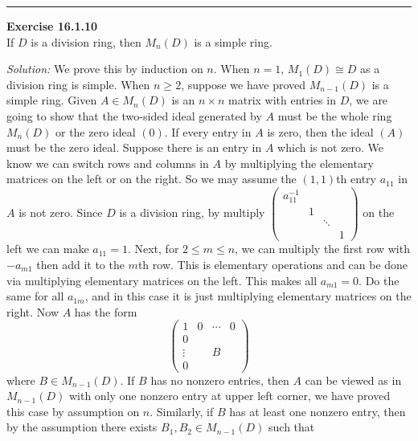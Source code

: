 \documentclass[a4paper, 12pt]{article}
\newenvironment{problem}[2][Exercise]
    { \begin{mdframed}[backgroundcolor=gray!20] \textbf{#1 #2} \\}
    {  \end{mdframed}}
\newenvironment{solution}
    {\textit{Solution:}}
    {}
\begin{document}
\noindent\rule{7in}{2.8pt}
\begin{problem}{16.1.10}
If \(D\) is a division ring, then \(M_n(D)\) is a simple ring.
\end{problem}
\begin{solution}
We prove this by induction on \(n\). When \(n=1\), \(M_1(D)\cong D\) as a division ring is simple. When \(n\geq 2\), suppose we have proved \(M_{n-1}(D)\) is a simple ring. Given \(A\in M_n(D)\) is an \(n\times n\) 
matrix with entries in \(D\), we are going to show that the two-sided ideal generated by \(A\) must be the whole ring \(M_n(D)\) or the zero ideal \((0)\). If every entry in \(A\) is zero, then the ideal \((A)\) must be the zero ideal. Suppose there is an entry in \(A\) which is 
not zero. We know we can switch rows and columns in \(A\) by multiplying the elementary matrices on the left or on the right. So we may assume the \((1,1)\)th entry \(a_{11}\) in \(A\) is not zero. Since \(D\) is a division ring, by multiply 
\(\begin{pmatrix}
    a_{11}^{-1}& & & \\
    & 1 & & \\ 
    & & \ddots & \\ 
    & & & 1
\end{pmatrix}\) on the left we can make \(a_{11}=1\). Next, for \(2\leq m\leq n\), we can multiply the first row with \(-a_{m1}\) then add it to the \(m\)th row. This is elementary operations and can be done via multiplying elementary matrices on the left. This makes all 
\(a_{m1}=0\). Do the same for all \(a_{1m}\), and in this case it is just multiplying elementary matrices on the right. Now \(A\) has the form 
\[\begin{pmatrix}
    1 & 0 &\cdots & 0\\ 
    0 &   &       &   \\ 
    \vdots & & B &  \\ 
    0 & & &
\end{pmatrix}\] 
where \(B\in M_{n-1}(D)\). If \(B\) has no nonzero entries, then \(A\) can be viewed as in \(M_{n-1}(D)\) with only one nonzero entry at upper left corner, we have proved this case by assumption on \(n\). Similarly, if \(B\) has at least one nonzero entry, then 
by the assumption there exists \(B_1,B_2\in M_{n-1}(D)\) such that  

\end{solution}
\end{document}
